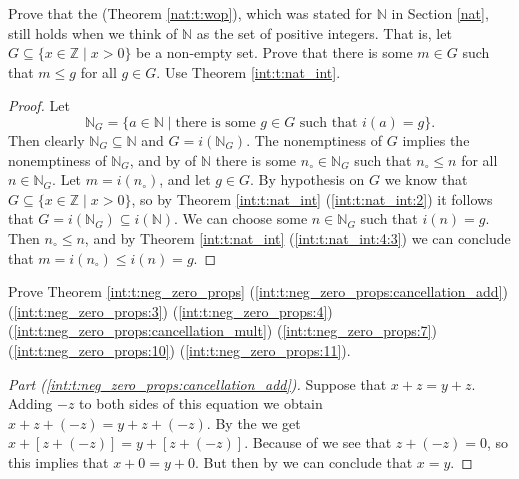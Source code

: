 \Newpage
\begin{exercise} %
	Prove that the  (Theorem \ref{nat:t:wop}), which was stated for $\mathbb{N}$ in Section \ref{nat}, still holds when we think of $\mathbb{N}$ as the set of positive integers. That is, let $G \subseteq \{ x \in \mathbb{Z} \mid x > 0 \}$ be a non-empty set. Prove that there is some $m \in G$ such that $m \leq g$ for all $g \in G$. Use Theorem \ref{int:t:nat_int}.
\end{exercise}

\begin{proof}
	Let
	\[
		\mathbb{N}_{G} = \{ a \in \mathbb{N} \mid \text{there is some } g \in G \text{ such that } i(a) = g \}.
	\]
	Then clearly $\mathbb{N}_{G} \subseteq \mathbb{N}$ and $G = i(\mathbb{N}_{G})$. The nonemptiness of $G$ implies the nonemptiness of $\mathbb{N}_{G}$, and by  of $\mathbb{N}$ there is some $n_{\circ} \in \mathbb{N}_{G}$ such that $n_{\circ} \leq n$ for all ${n \in \mathbb{N}_{G}}$. Let $m = i(n_{\circ})$, and let $g \in G$. By hypothesis on $G$ we know that ${G \subseteq \{ x \in \mathbb{Z} \mid x > 0 \}}$, so by Theorem \ref{int:t:nat_int} (\ref{int:t:nat_int:2}) it follows that $G = i(\mathbb{N}_{G}) \subseteq i(\mathbb{N})$. We can choose some $n \in \mathbb{N}_{G}$ such that $i(n) = g$. Then $n_{\circ} \leq n$, and by Theorem \ref{int:t:nat_int} (\ref{int:t:nat_int:4:3}) we can conclude that $m = i(n_{\circ}) \leq i(n) = g$.
\end{proof}


\Newpage
\begin{exercise} %
	\label{int:e:11}
	Prove Theorem \ref{int:t:neg_zero_props} (\ref{int:t:neg_zero_props:cancellation_add}) (\ref{int:t:neg_zero_props:3}) (\ref{int:t:neg_zero_props:4}) (\ref{int:t:neg_zero_props:cancellation_mult}) (\ref{int:t:neg_zero_props:7}) (\ref{int:t:neg_zero_props:10}) (\ref{int:t:neg_zero_props:11}).
\end{exercise}

\begin{proof}[Part (\ref{int:t:neg_zero_props:cancellation_add})]
	\label{int:e:11:1}
	Suppose that $x + z = y + z$. Adding $-z$ to both sides of this equation we obtain $x + z + (-z) = y + z + (-z)$. By the  we get $x + [z + (-z)] = y + [z + (-z)]$. Because of  we see that $z + (-z) = 0$, so this implies that $x + 0 = y + 0$. But then by  we can conclude that $x = y$.
\end{proof}

